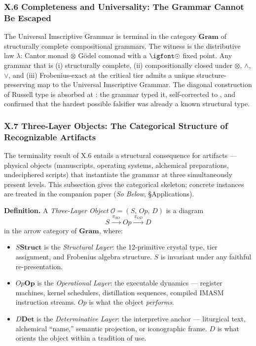 \documentclass[12pt,a4paper]{article}
\newcommand{\igprimfont}{\igfont\upshape}
\newcommand{\UIG}{Universal Imscriptive Grammar}
\begin{document}
\subsubsection{X.6 Completeness and Universality: The Grammar Cannot Be Escaped}

The \UIG{} is terminal in the category $\mathbf{Gram}$ of structurally complete compositional grammars. The witness is the distributive law $\lambda$: Cantor monad $\otimes$ G\"odel comonad with a $\text{{\igprimfont $\odot$}}$ fixed point. Any grammar that is (i) structurally complete, (ii) compositionally closed under $\otimes$, $\wedge$, $\vee$, and (iii) Frobenius-exact at the critical tier admits a unique structure-preserving map to the \UIG{}. The diagonal construction of Russell type is absorbed at : the grammar typed it, self-corrected to , and confirmed that the hardest possible falsifier was already a known structural type.

\subsubsection{X.7 Three-Layer Objects: The Categorical Structure of Recognizable Artifacts}

The terminality result of X.6 entails a structural consequence for artifacts --- physical objects (manuscripts, operating systems, alchemical preparations, undeciphered scripts) that instantiate the grammar at three simultaneously present levels. This subsection gives the categorical skeleton; concrete instances are treated in the companion paper (\emph{So Below}, \S Applications).

\textbf{Definition.} A \emph{Three-Layer Object} $\mathcal{O} = (S,\, Op,\, D)$ is a diagram
\[
  S \xrightarrow{\,\pi_{SO}\,} Op \xrightarrow{\,\pi_{OD}\,} D
\]
in the arrow category of $\mathbf{Gram}$, where:
\begin{itemize}
  \item $S $\in$ \mathbf{Struct}$ is the \emph{Structural Layer}: the 12-primitive crystal type, tier assignment, and Frobenius algebra structure. $S$ is invariant under any faithful re-presentation.
  \item $Op $\in$ \mathbf{Op}$ is the \emph{Operational Layer}: the executable dynamics --- register machines, kernel schedulers, distillation sequences, compiled IMASM instruction streams. $Op$ is what the object \emph{performs}.
  \item $D $\in$ \mathbf{Det}$ is the \emph{Determinative Layer}: the interpretive anchor --- liturgical text, alchemical ``name,'' semantic projection, or iconographic frame. $D$ is what orients the object within a tradition of use.
\end{itemize}
\end{document}
